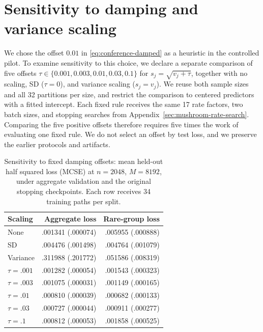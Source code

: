 \section{Sensitivity to damping and variance scaling}
\label{sec:mushroom-sensitivity}

We chose the offset $0.01$ in \eqref{eq:conference-damped} as a heuristic in
the controlled pilot. To examine sensitivity to this choice, we declare a
separate comparison of five offsets
$\tau \in \{0.001,0.003,0.01,0.03,0.1\}$ for $s_j = \sqrt{v_j + \tau}$,
together with no scaling, SD ($\tau = 0$), and variance scaling ($s_j = v_j$).
We reuse both sample sizes and all 32 partitions per size, and restrict the
comparison to centered predictors with a fitted intercept. Each fixed rule
receives the same 17 rate factors, two batch sizes, and stopping searches from
Appendix~\ref{sec:mushroom-rate-search}. Comparing the five positive offsets
therefore requires five times the work of evaluating one fixed rule. We do not
select an offset by test loss, and we preserve the earlier protocols and
artifacts.

\begin{table}[ht]
  \centering
  \begin{tabular}{lrr}
    \toprule
    Scaling       &    Aggregate loss &   Rare-group loss \\
    \midrule
    None          & .001341 (.000074) & .005955 (.000888) \\
    SD            & .004476 (.001498) & .004764 (.001079) \\
    Variance      & .311988 (.201772) & .051586 (.008319) \\
    $\tau = .001$ & .001282 (.000054) & .001543 (.000323) \\
    $\tau = .003$ & .001075 (.000031) & .001149 (.000165) \\
    $\tau = .01$  & .000810 (.000039) & .000682 (.000133) \\
    $\tau = .03$  & .000727 (.000044) & .000911 (.000277) \\
    $\tau = .1$   & .000812 (.000053) & .001858 (.000525) \\
    \bottomrule
  \end{tabular}
  \caption{
    Sensitivity to fixed damping offsets: mean held-out half squared loss (MCSE) at
    $n = 2048$, $M = 8192$, under aggregate validation and the original stopping
    checkpoints. Each row receives 34 training paths per split.
  }
  \label{tab:mushroom-sensitivity}
\end{table}

